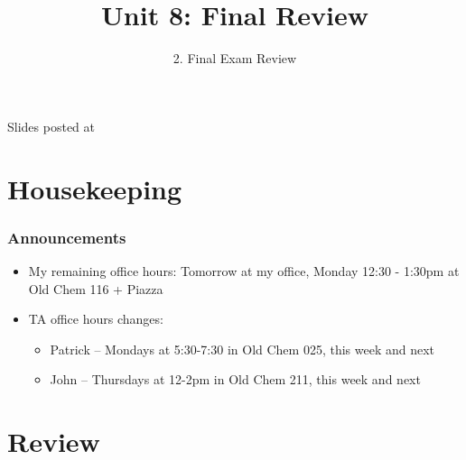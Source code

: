 \documentclass[slidestop,compress,mathserif,12pt,t,professionalfonts,xcolor=table]{beamer}
\title{Unit 8: Final Review}
\subtitle{2. Final Exam Review}
\author{\CourseName}
\date{}
\institute{\InstituteName}
\begin{document}



\begin{frame}[plain]

\titlepage

\vfill

{\scriptsize {} \hfill Slides posted at  \webURL{\CourseSite}}

\addtocounter{framenumber}{-1} 

\end{frame}


\section{Housekeeping}


\begin{frame}
\frametitle{Announcements}

\begin{itemize}

\item My remaining office hours: Tomorrow at my office, Monday 12:30 - 1:30pm at Old Chem 116 + Piazza

\item TA office hours changes:
\begin{itemize}
\item Patrick -- Mondays at 5:30-7:30 in Old Chem 025, this week and next
\item John -- Thursdays at 12-2pm in Old Chem 211, this week and next
\end{itemize}

\end{itemize}

\end{frame}


\section{Review}

\end{document}

